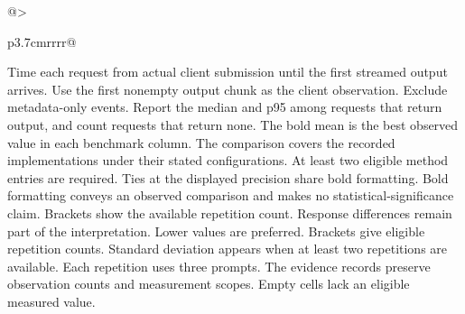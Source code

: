 \begin{table}[!htp]
\begin{tabular}{@{}>{\raggedright\arraybackslash}p{3.7cm}rrrr@{}}
\bottomrule
\end{tabular}\par\medskip
\begin{minipage}{\linewidth}\footnotesize
Time each request from actual client submission until the first streamed output arrives. Use the first nonempty output chunk as the client observation. Exclude metadata-only events. Report the median and p95 among requests that return output, and count requests that return none.
The bold mean is the best observed value in each benchmark column. The comparison covers the recorded implementations under their stated configurations. At least two eligible method entries are required. Ties at the displayed precision share bold formatting. Bold formatting conveys an observed comparison and makes no statistical-significance claim. Brackets show the available repetition count. Response differences remain part of the interpretation. Lower values are preferred.
Brackets give eligible repetition counts. Standard deviation appears when at least two repetitions are available. Each repetition uses three prompts. The evidence records preserve observation counts and measurement scopes. Empty cells lack an eligible measured value.
\end{minipage}
\end{table}

